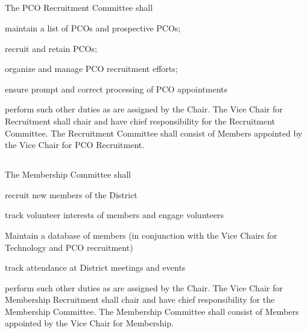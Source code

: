 \documentclass{article}
\begin{document}
\subsection{}
The PCO Recruitment Committee shall
\begin{inlinealphalist}
    \item maintain a list of PCOs and prospective PCOs;
    \item recruit and retain PCOs;
    \item organize and manage PCO recruitment efforts;
    \item ensure prompt and correct processing of PCO appointments
    \item perform such other duties as are assigned by the Chair. The Vice Chair for Recruitment shall chair and have chief responsibility for the Recruitment Committee.  The Recruitment Committee shall consist of Members appointed by the Vice Chair for PCO Recruitment.
\end{inlinealphalist}

\subsection{}
The Membership Committee shall
\begin{inlinealphalist}
    \item recruit new members of the District
    \item track volunteer interests of members and engage volunteers
    \item Maintain a database of members (in conjunction with the Vice Chairs for Technology and PCO recruitment)
    \item track attendance at District meetings and events
    \item perform such other duties as are assigned by the Chair. The Vice Chair for Membership Recruitment shall chair and have chief responsibility for the Membership Committee. The Membership Committee shall consist of Members appointed by the Vice Chair for Membership.
\end{inlinealphalist}
\end{document}
